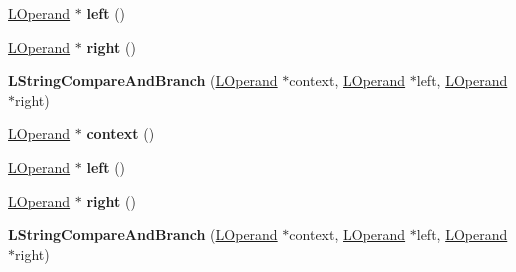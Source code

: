 \begin{DoxyCompactItemize}
\item 
\hyperlink{classv8_1_1internal_1_1_l_operand}{L\+Operand} $\ast$ {\bfseries left} ()\hypertarget{classv8_1_1internal_1_1_l_string_compare_and_branch_a03846e908189b71209c862508f37b51a}{}\label{classv8_1_1internal_1_1_l_string_compare_and_branch_a03846e908189b71209c862508f37b51a}

\item 
\hyperlink{classv8_1_1internal_1_1_l_operand}{L\+Operand} $\ast$ {\bfseries right} ()\hypertarget{classv8_1_1internal_1_1_l_string_compare_and_branch_acb46bd2af08a91bc102ec2b5e919c6b5}{}\label{classv8_1_1internal_1_1_l_string_compare_and_branch_acb46bd2af08a91bc102ec2b5e919c6b5}

\item 
{\bfseries L\+String\+Compare\+And\+Branch} (\hyperlink{classv8_1_1internal_1_1_l_operand}{L\+Operand} $\ast$context, \hyperlink{classv8_1_1internal_1_1_l_operand}{L\+Operand} $\ast$left, \hyperlink{classv8_1_1internal_1_1_l_operand}{L\+Operand} $\ast$right)\hypertarget{classv8_1_1internal_1_1_l_string_compare_and_branch_abdd07c36cdda51e9673d4ee4dfc2734d}{}\label{classv8_1_1internal_1_1_l_string_compare_and_branch_abdd07c36cdda51e9673d4ee4dfc2734d}

\item 
\hyperlink{classv8_1_1internal_1_1_l_operand}{L\+Operand} $\ast$ {\bfseries context} ()\hypertarget{classv8_1_1internal_1_1_l_string_compare_and_branch_a15d4b6ad859b22bf4141edc055fe8050}{}\label{classv8_1_1internal_1_1_l_string_compare_and_branch_a15d4b6ad859b22bf4141edc055fe8050}

\item 
\hyperlink{classv8_1_1internal_1_1_l_operand}{L\+Operand} $\ast$ {\bfseries left} ()\hypertarget{classv8_1_1internal_1_1_l_string_compare_and_branch_a03846e908189b71209c862508f37b51a}{}\label{classv8_1_1internal_1_1_l_string_compare_and_branch_a03846e908189b71209c862508f37b51a}

\item 
\hyperlink{classv8_1_1internal_1_1_l_operand}{L\+Operand} $\ast$ {\bfseries right} ()\hypertarget{classv8_1_1internal_1_1_l_string_compare_and_branch_acb46bd2af08a91bc102ec2b5e919c6b5}{}\label{classv8_1_1internal_1_1_l_string_compare_and_branch_acb46bd2af08a91bc102ec2b5e919c6b5}

\item 
{\bfseries L\+String\+Compare\+And\+Branch} (\hyperlink{classv8_1_1internal_1_1_l_operand}{L\+Operand} $\ast$context, \hyperlink{classv8_1_1internal_1_1_l_operand}{L\+Operand} $\ast$left, \hyperlink{classv8_1_1internal_1_1_l_operand}{L\+Operand} $\ast$right)\hypertarget{classv8_1_1internal_1_1_l_string_compare_and_branch_abdd07c36cdda51e9673d4ee4dfc2734d}{}\label{classv8_1_1internal_1_1_l_string_compare_and_branch_abdd07c36cdda51e9673d4ee4dfc2734d}


\end{DoxyCompactItemize}
